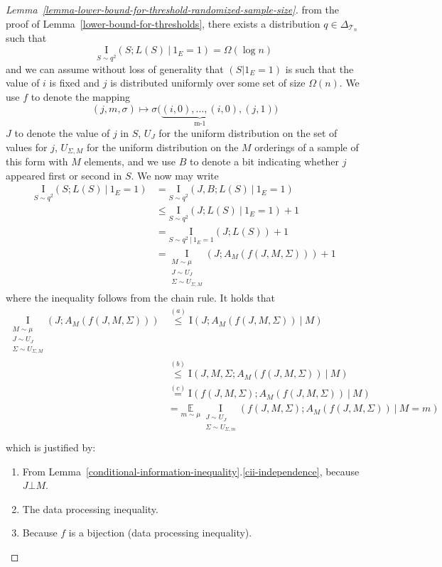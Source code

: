 \documentclass[final,12pt]{colt2018}
\newcommand{\EE}[1]{\underset{#1}{\mathbb{E}}}
\newcommand{\mc}[1]{\mathcal{#1}}
\newcommand{\cT}{\mc{T}}
\newcommand{\II}[1]{\mathrm{I}\left(#1\right)}
\newcommand{\I}[2]{\underset{#1}{\mathrm{I}}\left(#2\right)}
\begin{document}
\begin{proof}[Lemma~\ref{lemma-lower-bound-for-threshold-randomized-sample-size}]
	from the proof of Lemma~\ref{lower-bound-for-thresholds}, there exists a distribution $q\in\Delta_{\cT_n}$ such that
	\[
	\I{S \sim q^2}{S;L(S) \:|\: 1_E=1} = \Omega(\log n)
	\]
	and we can assume without loss of generality that $(S|1_E=1)$ is such that the value of $i$ is fixed and $j$ is distributed uniformly over some set of size $\Omega(n)$. We use $f$ to denote the mapping 
	\[
	(j, m, \sigma) \longmapsto \sigma\big(\underbrace{(i,0),\dots,(i,0)}_{\text{ m-1 }},(j,1)\big)
	\]
	$J$ to denote the value of $j$ in $S$, $U_J$ for the uniform distribution on the set of values for $j$, $U_{\Sigma,M}$ for the uniform distribution on the $M$ orderings of a sample of this form with $M$ elements, and we use $B$ to denote a bit indicating whether $j$ appeared first or second in $S$. We now may write
	\begin{align*}
	\I{S \sim q^2}{S;L(S) \:|\: 1_E=1} & = \I{S \sim q^2}{J,B;L(S) \:|\: 1_E=1} \\
	& \leq \I{S \sim q^2}{J;L(S) \:|\: 1_E=1} + 1 \\
	& = \I{S \sim q^2\:|\: 1_E=1}{J;L(S)} + 1 \\
	& = \I{\substack{M \sim \mu \\ J \sim U_J \\ \Sigma \sim U_{\Sigma,M}}}{J;A_M(f(J,M,\Sigma))} + 1
	\end{align*}
	where the inequality follows from the chain rule. It holds that
	\begin{align*}
	\I{\substack{M \sim \mu \\ J \sim U_J \\ \Sigma \sim U_{\Sigma,M}}}{J;A_M(f(J,M,\Sigma))} 
	& \stackrel{(a)}{\leq} \II{J;A_M(f(J,M,\Sigma)) \: | \: M} \\ 
	& \stackrel{(b)}{\leq} \II{J,M,\Sigma;A_M(f(J,M,\Sigma)) \: | \: M} \\
	& \stackrel{(c)}{=} \II{f(J,M,\Sigma);A_M(f(J,M,\Sigma)) \: | \: M} \\
	& = \EE{m \sim \mu} \: \I{\substack{J \sim U_J \\ \Sigma \sim U_{\Sigma,m}}}{f(J,M,\Sigma);A_M(f(J,M,\Sigma)) \: | \: M=m} \\
	\end{align*}
	which is justified by:
	\begin{enumerate}[label=(\alph*)]
		\item{From Lemma~\ref{conditional-information-inequality}.\ref{cii-independence}, because $J \bot M$.}
		\item{The data processing inequality.}
		\item{Because $f$ is a bijection (data processing inequality).}
	\end{enumerate}
	

\end{proof}
\end{document}

